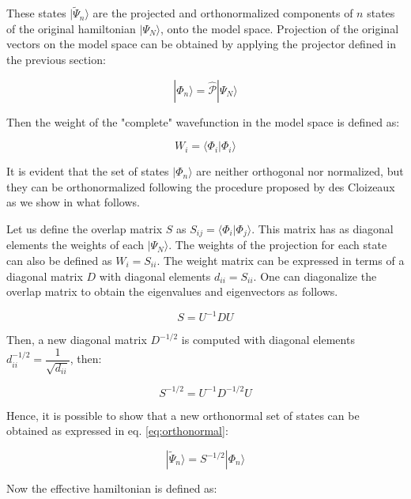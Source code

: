 \documentclass[12pt,twoside]{report}
\begin{document}
	These states $|\tilde{\Psi}_n\rangle$ are the projected and orthonormalized
	components of $n$ states of the original hamiltonian $|\Psi_N\rangle$, onto
	the model space.  Projection of the original vectors on the model space can
	be obtained by applying the projector defined in the previous section:

	\begin{equation}
	    |\Phi_n\rangle=\hat{\mathcal{P}}|\Psi_N\rangle
	\end{equation}

	Then the weight of the "complete" wavefunction in the model space is defined as:

	\begin{equation}
	    W_i =\langle \Phi_i|\Phi_i\rangle
	\end{equation}

	It is evident that the set of states $|\Phi_n\rangle$ are neither orthogonal nor
	normalized, but they can be orthonormalized following the procedure proposed
	by  des Cloizeaux \cite{Cloizeaux} as we show in what follows.

	Let us define the overlap matrix $S$ as $S_{ij} = \langle \Phi_i |
	\Phi_j\rangle$.  This matrix has as diagonal elements the weights of each
	$|\Psi_N\rangle$.  The weights of the projection for each state can also be
	defined as  $W_i=S_{ii}$.  The weight matrix can be expressed in terms of a
	diagonal matrix $D$ with diagonal elements $d_{ii} = S_{ii}$. One can
	diagonalize the overlap matrix to obtain the eigenvalues and eigenvectors as
	follows.

	\begin{equation}
	    S=U^{-1}DU
	\end{equation}

	Then, a new diagonal matrix $D^{-1\slash 2}$ is computed with diagonal
	elements $d^{-1\slash 2}_{ii}=\dfrac{1}{\sqrt{d_{ii}}}$, then:

	\begin{equation}
	   S^{-1\slash 2}=U^{-1}D^{-1\slash 2}U 
	\end{equation}

	Hence, it is possible to show that a new orthonormal set of states can be
	obtained as expressed in eq. \ref{eq:orthonormal}:

	\begin{equation}
	   |\tilde{\Psi}_n \rangle=S^{-1 \slash 2}|\Phi_n \rangle
	   \label{eq:orthonormal}
	\end{equation}

	Now the effective hamiltonian is defined as:
\end{document}
